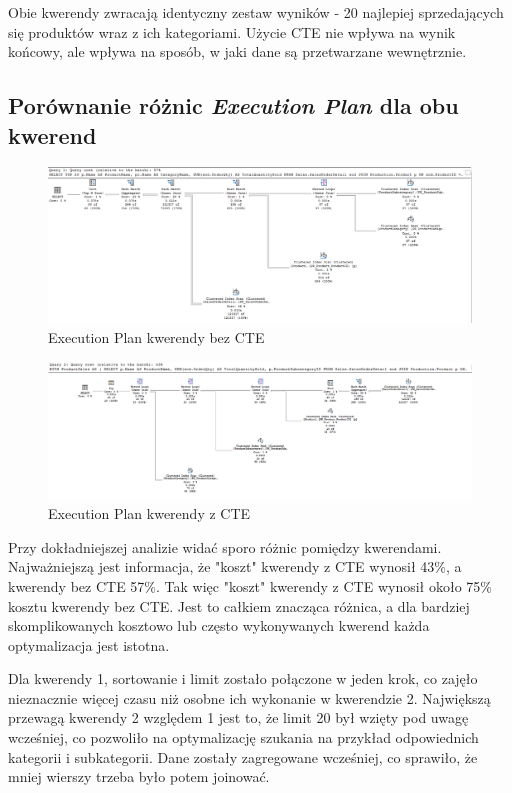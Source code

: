 \documentclass[a4paper,12pt]{article}
\begin{document}
Obie kwerendy zwracają identyczny zestaw wyników - 20 najlepiej sprzedających się produktów wraz z ich kategoriami. Użycie CTE nie wpływa na wynik końcowy, ale wpływa na sposób, w jaki dane są przetwarzane wewnętrznie.

\subsection{Porównanie różnic \textit{Execution Plan} dla obu kwerend}

\begin{figure}[H]
  \centering
  \includegraphics[width=1.0\textwidth]{images/query_1_plan.png}
  \caption{Execution Plan kwerendy bez CTE}
\end{figure}

\begin{figure}[H]
  \centering
  \includegraphics[width=1.0\textwidth]{images/query_2_plan.png}
  \caption{Execution Plan kwerendy z CTE}
\end{figure}

Przy dokładniejszej analizie widać sporo różnic pomiędzy kwerendami. Najważniejszą jest informacja, że "koszt" kwerendy z CTE wynosił 43\%, a kwerendy bez CTE 57\%. Tak więc "koszt" kwerendy z CTE wynosił około 75\% kosztu kwerendy bez CTE. Jest to całkiem znacząca różnica, a dla bardziej skomplikowanych kosztowo lub często wykonywanych kwerend każda optymalizacja jest istotna.

Dla kwerendy 1, sortowanie i limit zostało połączone w jeden krok, co zajęło nieznacznie więcej czasu niż osobne ich wykonanie w kwerendzie 2. Największą przewagą kwerendy 2 względem 1 jest to, że limit 20 był wzięty pod uwagę wcześniej, co pozwoliło na optymalizację szukania na przykład odpowiednich kategorii i subkategorii. Dane zostały zagregowane wcześniej, co sprawiło, że mniej wierszy trzeba było potem joinować.
\end{document}

